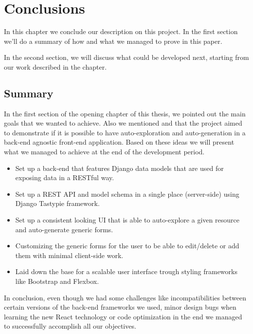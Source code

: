 \chapter{Conclusions}
\label{chapter:conclusions}

In this chapter we conclude our description on this project. In the first section  we'll do a summary of how and what we managed to prove in this paper.

In the second section,  we will discuss what could be developed next, starting from our work described in the  chapter.

\section{Summary}
\label{sec:summary}

In the first section of the opening chapter of this thesis, we pointed out the main goals that we wanted to achieve. Also we mentioned and that the project aimed to demonstrate if it is possible to have auto-exploration and auto-generation in a back-end agnostic front-end application. Based on these ideas we will present what we managed to achieve at the end of the development period.

\begin{itemize}
	\item Set up a back-end that features Django data models that are used for exposing data in a RESTful way.
	\item Set up a REST API and model schema in a single place (server-side) using Django Tastypie framework.
	\item Set up a consistent looking UI that is able to auto-explore a given resource and auto-generate generic forms.
	\item Customizing the generic forms for the user to be able to edit/delete or add them with minimal client-side work.
	\item Laid down the base for a scalable user interface trough styling frameworks like Bootstrap and Flexbox.
\end{itemize}

In conclusion, even though we had some challenges like incompatibilities between certain versions of the back-end frameworks we used, minor design bugs when learning the new React technology or code optimization in the end we managed to successfully accomplish all our objectives.

